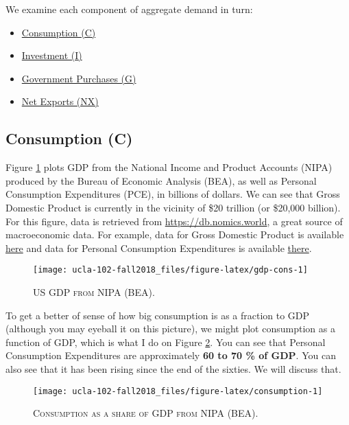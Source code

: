 \documentclass[]{book}
\providecommand{\tightlist}{%
  \setlength{\itemsep}{0pt}\setlength{\parskip}{0pt}}
\theoremstyle{definition}
\theoremstyle{definition}
\theoremstyle{definition}
\theoremstyle{remark}
\begin{document}
We examine each component of aggregate demand in turn:

\begin{itemize}
\tightlist
\item
  \protect\hyperlink{cons}{Consumption (C)}
\item
  \protect\hyperlink{inv}{Investment (I)}
\item
  \protect\hyperlink{gov}{Government Purchases (G)}
\item
  \protect\hyperlink{net-exports}{Net Exports (NX)}
\end{itemize}

\hypertarget{cons}{\subsection{Consumption (C)}\label{cons}}

Figure \ref{fig:gdp-cons} plots GDP from the National Income and Product
Accounts (NIPA) produced by the Bureau of Economic Analysis (BEA), as
well as Personal Consumption Expenditures (PCE), in billions of dollars.
We can see that Gross Domestic Product is currently in the vicinity of
\$20 trillion (or \$20,000 billion). For this figure, data is retrieved
from \url{https://db.nomics.world}, a great source of macroeconomic
data. For example, data for Gross Domestic Product is available
\href{https://db.nomics.world/BEA/NIPA-T10105/A191RC-Q}{here} and data
for Personal Consumption Expenditures is available
\href{https://db.nomics.world/BEA/NIPA-T10105/DPCERC-Q}{there}.



\begin{figure}

{\centering \texttt{[image: ucla-102-fall2018\_files/figure-latex/gdp-cons-1]} 

}

\caption{\textsc{US GDP from NIPA (BEA)}.}\label{fig:gdp-cons}
\end{figure}

To get a better of sense of how big consumption is as a fraction to GDP
(although you may eyeball it on this picture), we might plot consumption
as a function of GDP, which is what I do on Figure
\ref{fig:consumption}. You can see that Personal Consumption
Expenditures are approximately \textbf{60 to 70 \% of GDP}. You can also
see that it has been rising since the end of the sixties. We will
discuss that.




\begin{figure}

{\centering \texttt{[image: ucla-102-fall2018\_files/figure-latex/consumption-1]} 

}

\caption{\textsc{Consumption as a share of GDP from NIPA
(BEA)}.}\label{fig:consumption}
\end{figure}
\end{document}
